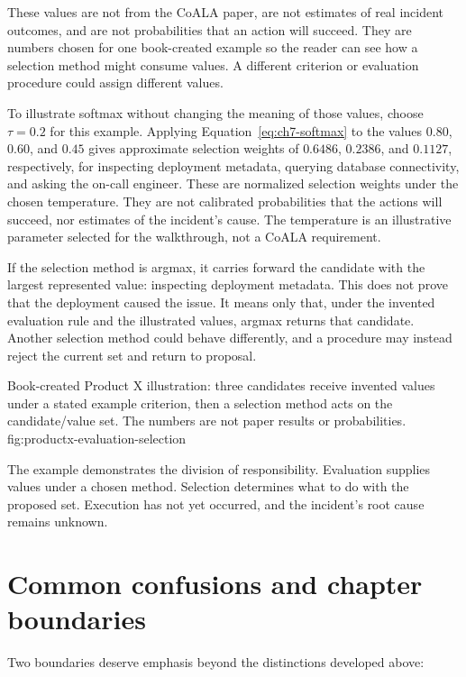 These values are not from the CoALA paper, are not estimates of real incident outcomes, and are not probabilities that an action will succeed. They are numbers chosen for one book-created example so the reader can see how a selection method might consume values. A different criterion or evaluation procedure could assign different values.

To illustrate softmax without changing the meaning of those values, choose \(\tau=0.2\) for this example. Applying Equation~\ref{eq:ch7-softmax} to the values \(0.80\), \(0.60\), and \(0.45\) gives approximate selection weights of \(0.6486\), \(0.2386\), and \(0.1127\), respectively, for inspecting deployment metadata, querying database connectivity, and asking the on-call engineer. These are normalized selection weights under the chosen temperature. They are not calibrated probabilities that the actions will succeed, nor estimates of the incident's cause. The temperature is an illustrative parameter selected for the walkthrough, not a CoALA requirement.

If the selection method is argmax, it carries forward the candidate with the largest represented value: inspecting deployment metadata. This does not prove that the deployment caused the issue. It means only that, under the invented evaluation rule and the illustrated values, argmax returns that candidate. Another selection method could behave differently, and a procedure may instead reject the current set and return to proposal.

  {Book-created Product X illustration: three candidates receive invented values under a stated example criterion, then a selection method acts on the candidate/value set. The numbers are not paper results or probabilities.}
  {fig:productx-evaluation-selection}

The example demonstrates the division of responsibility. Evaluation supplies values under a chosen method. Selection determines what to do with the proposed set. Execution has not yet occurred, and the incident's root cause remains unknown.

\section{Common confusions and chapter boundaries}
\label{sec:evaluation-boundaries}

Two boundaries deserve emphasis beyond the distinctions developed above:

